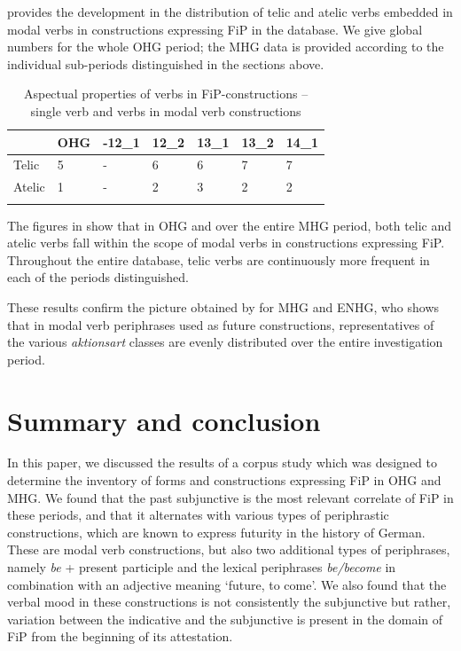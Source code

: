 \documentclass[output=paper,colorlinks,citecolor=brown]{langscibook}
\begin{document}
 provides the development in the distribution of telic and atelic verbs embedded in modal verbs in constructions expressing FiP in the database. We give global numbers for the whole OHG period; the MHG data is provided according to the individual sub-periods distinguished in the sections above.

\begin{table}
    \begin{tabularx}{\textwidth}{QYYYYYY}
        \lsptoprule
        & OHG & {-12\_1} & {12\_2} & {13\_1} & {13\_2} & {14\_1} \\
        \midrule
        {Telic} & 5 & - & 6 & 6 & 7 & 7\\
        {Atelic} & 1 & - & 2 & 3 & 2 & 2 \\
        \lspbottomrule
    \end{tabularx}
     \caption{Aspectual properties of verbs in FiP-constructions – single verb and verbs in modal verb constructions}
    \label{tab:13}
\end{table}

The figures in  show that in OHG and over the entire MHG period, both telic and atelic verbs fall within the scope of modal verbs in constructions expressing FiP. Throughout the entire database, telic verbs are continuously more frequent in each of the periods distinguished. 

These results confirm the picture obtained by \citet{Hartmann2021} for MHG and ENHG, who shows that in modal verb periphrases used as future constructions, representatives of the various \textit{aktionsart} classes are evenly distributed over the entire investigation period.


\section{Summary and conclusion} \label{section 5}

In this paper, we discussed the results of a corpus study which was designed to determine the inventory of forms and constructions expressing FiP in OHG and MHG. We found that the past subjunctive is the most relevant correlate of FiP in these periods, and that it alternates with various types of periphrastic constructions, which are known to express futurity in the history of German. These are modal verb constructions, but also two additional types of periphrases, namely \textit{be} + present participle and the lexical periphrases \textit{be/become} in combination with an adjective meaning ‘future, to come’. We also found that the verbal mood in these constructions is not consistently the subjunctive but rather, variation between the indicative and the subjunctive is present in the domain of FiP from the beginning of its attestation. 
\end{document}
